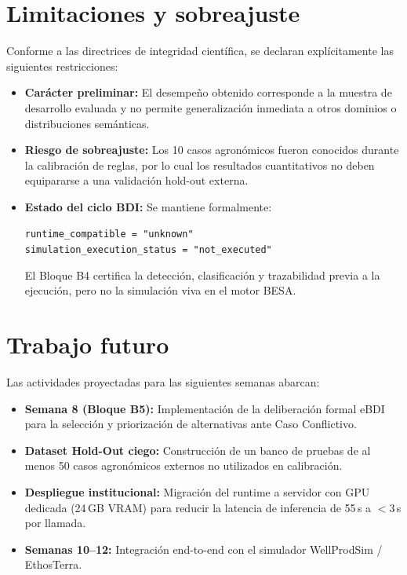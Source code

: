 \documentclass[11pt,a4paper]{article}
\begin{document}
\section{Limitaciones y sobreajuste}
Conforme a las directrices de integridad científica, se declaran explícitamente las siguientes restricciones:
\begin{itemize}[leftmargin=*]
    \item \textbf{Carácter preliminar:} El desempeño obtenido corresponde a la muestra de desarrollo evaluada y no permite generalización inmediata a otros dominios o distribuciones semánticas.
    \item \textbf{Riesgo de sobreajuste:} Los 10 casos agronómicos fueron conocidos durante la calibración de reglas, por lo cual los resultados cuantitativos no deben equipararse a una validación hold-out externa.
    \item \textbf{Estado del ciclo BDI:} Se mantiene formalmente:
    \begin{center}
        \texttt{runtime\_compatible = "unknown"} \\
        \texttt{simulation\_execution\_status = "not\_executed"}
    \end{center}
    El Bloque B4 certifica la detección, clasificación y trazabilidad previa a la ejecución, pero no la simulación viva en el motor BESA.
\end{itemize}

\section{Trabajo futuro}
Las actividades proyectadas para las siguientes semanas abarcan:
\begin{itemize}[leftmargin=*]
    \item \textbf{Semana 8 (Bloque B5):} Implementación de la deliberación formal eBDI para la selección y priorización de alternativas ante Caso Conflictivo.
    \item \textbf{Dataset Hold-Out ciego:} Construcción de un banco de pruebas de al menos 50 casos agronómicos externos no utilizados en calibración.
    \item \textbf{Despliegue institucional:} Migración del runtime a servidor con GPU dedicada (24\,GB VRAM) para reducir la latencia de inferencia de 55\,s a $<3$\,s por llamada.
    \item \textbf{Semanas 10--12:} Integración end-to-end con el simulador WellProdSim / EthosTerra.
\end{itemize}
\end{document}
